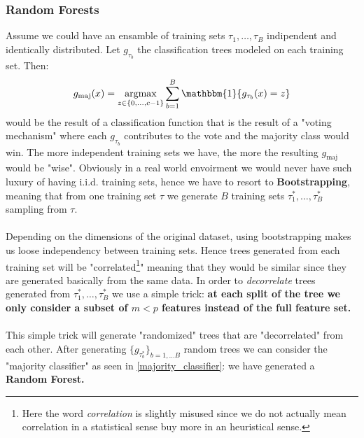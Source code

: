 \subsubsection*{Random Forests}
Assume we could have an ensamble of training sets \(\tau_1, \dots , \tau_B\) indipendent and identically distributed. Let \(g_{\tau_b}\) the classification trees modeled on each training set. Then:
\begin{equation}
    \label{majority_classifier}
    g_{\text{maj}}(x) = \argmax_{z \in \{0, \dots, c-1\}}  \sum \limits_{b= 1}^{B} \mathbbm{1}\{g_{\tau_b}(x) = z\}
\end{equation} 
would be the result of a classification function that is the result of a "voting mechanism" where each \(g_{\tau_b}\) contributes to the vote and the majority class would win. The more independent training sets we have, the more the resulting \(g_{\text{maj}}\) would be "wise". Obviously in a real world envoirment we would never have such luxury of having i.i.d. training sets, hence we have to resort to \textbf{Bootstrapping}, meaning that from one training set \(\tau\) we generate \(B\) training sets \(\tau^*_1, \dots , \tau^*_B\) sampling from \(\tau\). \\
\\
Depending on the dimensions of the original dataset, using bootstrapping makes us loose independency between training sets. Hence trees generated from each training set will be "correlated\footnote{Here the word \textit{correlation} is slightly misused since we do not actually mean correlation in a statistical sense buy more in an heuristical sense.}" meaning that they would be similar since they are generated basically from the same data. In order to \textit{decorrelate} trees generated from \(\tau^*_1, \dots , \tau^*_B\) we use a simple trick: \textbf{at each split of the tree we only consider a subset of \(m< p\) features instead of the full feature set.}
\\
\\
This simple trick will generate "randomized" trees that are "decorrelated" from each other. After generating \(\{g_{\tau^*_b}\}_{b = 1, \dots B}\) random trees we can consider the "majority classifier" as seen in \ref{majority_classifier}: we have generated a \textbf{Random Forest.}

